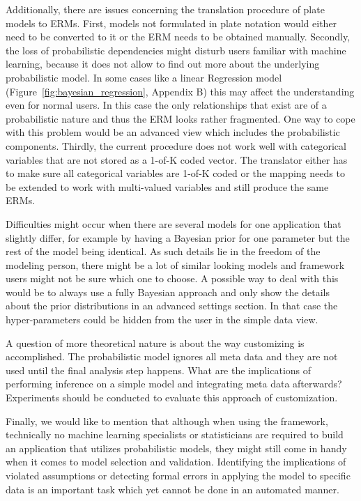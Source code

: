 Additionally, there are issues concerning the translation procedure of plate models to ERMs. First, models not formulated in plate notation would either need to be converted to it or the ERM needs to be obtained manually. Secondly, the loss of probabilistic dependencies might disturb users familiar with machine learning, because it does not allow to find out more about the underlying probabilistic model. In some cases like a linear Regression model (Figure~\ref{fig:bayesian_regression}, Appendix B) this may affect the understanding even for normal users. In this case the only relationships that exist are of a probabilistic nature and thus the ERM looks rather fragmented. One way to cope with this problem would be an advanced view which includes the probabilistic components. Thirdly, the current procedure does not work well with categorical variables that are not stored as a 1-of-K coded vector. The translator either has to make sure all categorical variables are 1-of-K coded or the mapping needs to be extended to work with multi-valued variables and still produce the same ERMs.

Difficulties might occur when there are several models for one application that slightly differ, for example by having a Bayesian prior for one parameter but the rest of the model being identical. As such details lie in the freedom of the modeling person, there might be a lot of similar looking models and framework users might not be sure which one to choose. A possible way to deal with this would be to always use a fully Bayesian approach and only show the details about the prior distributions in an advanced settings section. In that case the hyper-parameters could be hidden from the user in the simple data view.

A question of more theoretical nature is about the way customizing is accomplished. The probabilistic model ignores all meta data and they are not used until the final analysis step happens. What are the implications of performing inference on a simple model and integrating meta data afterwards? Experiments should be conducted to evaluate this approach of customization.

Finally, we would like to mention that although when using the framework, technically no machine learning specialists or statisticians are required to build an application that utilizes probabilistic models, they might still come in handy when it comes to model selection and validation. Identifying the implications of violated assumptions or detecting formal errors in applying the model to specific data is an important task which yet cannot be done in an automated manner.

